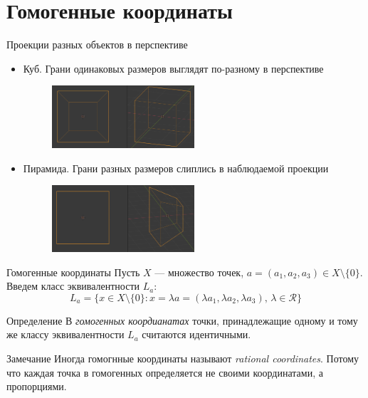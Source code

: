 \documentclass{beamer}
\begin{document}
\section{Гомогенные координаты}
\begin{frame}{Проекции разных объектов в перспективе}
    \begin{itemize}
        \item Куб. Грани одинаковых размеров выглядят по-разному в перспективе
        \begin{figure}
            \centering
            \includegraphics[width=0.5\textwidth]{cube_pespective.PNG}
            \label{fig:enter-label}
        \end{figure}
        \item  Пирамида. Грани разных размеров слиплись в наблюдаемой проекции
        \begin{figure}
            \centering
            \includegraphics[width=0.5\textwidth]{trapezoid_pespective.PNG}
            \label{fig:enter-label}
        \end{figure}
    \end{itemize}
\end{frame}
\begin{frame}{Гомогенные координаты}
Пусть $X$ --- множество точек, $a = (a_1, a_2, a_3) \in X \setminus \{0\}$. Введем класс эквивалентности $L_a$:
    \begin{equation*}
        L_{a} = \{x \in X \setminus \{0\}: x = \lambda a = (\lambda a_1, \lambda a_2, \lambda a_3),\, \lambda \in \mathcal{R} \}
    \end{equation*}
\begin{alertblock}{Определение}
    В \emph{гомогенных коордианатах} точки, принадлежащие одному и тому же классу эквивалентности $L_{a}$ считаются идентичными.
\end{alertblock}
\begin{block}{Замечание}
    Иногда гомогнные координаты называют \emph{rational coordinates}. Потому что каждая точка в гомогенных определяется не своими координатами, а пропорциями.
\end{block}
\end{frame}
\end{document}
